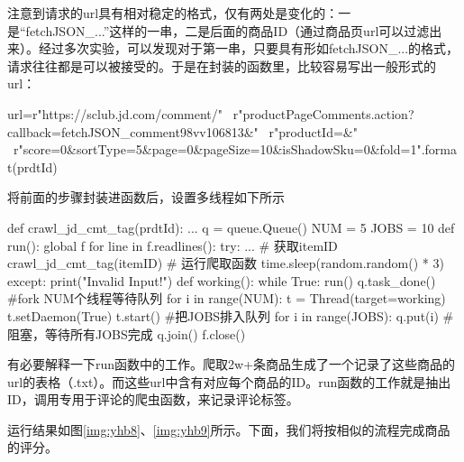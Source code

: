 注意到请求的url具有相对稳定的格式，仅有两处是变化的：一是“fetchJSON\_...”这样的一串，二是后面的商品ID（通过商品页url可以过滤出来）。经过多次实验，可以发现对于第一串，只要具有形如fetchJSON\_...的格式，请求往往都是可以被接受的。于是在封装的函数里，比较容易写出一般形式的url：

\begin{python}
url=r"https://sclub.jd.com/comment/" \
        r"productPageComments.action?callback=fetchJSON_comment98vv106813&" \
        r"productId={}&" \
        r"score=0&sortType=5&page=0&pageSize=10&isShadowSku=0&fold=1".format(prdtId)
\end{python}

将前面的步骤封装进函数后，设置多线程如下所示

\begin{python}
def crawl_jd_cmt_tag(prdtId):
    ...
q = queue.Queue()
NUM = 5
JOBS = 10
def run():
    global f
    for line in f.readlines():
        try:
            ... # 获取itemID
            crawl_jd_cmt_tag(itemID) # 运行爬取函数
            time.sleep(random.random() * 3)
        except:
            print("Invalid Input!")
def working():
    while True:
        run()
        q.task_done()
#fork NUM个线程等待队列
for i in range(NUM):
    t = Thread(target=working)
    t.setDaemon(True)
    t.start()
#把JOBS排入队列
for i in range(JOBS):
    q.put(i)
#阻塞，等待所有JOBS完成
q.join()
f.close()
\end{python}

有必要解释一下run函数中的工作。爬取2w+条商品生成了一个记录了这些商品的url的表格（.txt）。而这些url中含有对应每个商品的ID。run函数的工作就是抽出ID，调用专用于评论的爬虫函数，来记录评论标签。

运行结果如图\ref{img:yhb8}、\ref{img:yhb9}所示。下面，我们将按相似的流程完成商品的评分。

